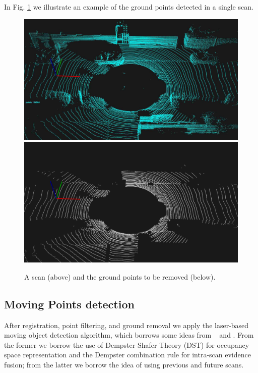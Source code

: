 In Fig. \ref{fig:groundremoval} we illustrate an example of the ground points detected in a single scan.



\begin{figure}
\setlength{\tabcolsep}{1pt}
\begin{center}
\includegraphics[width=0.8\columnwidth]{./img/ch-laser/beforeGroundRemoval} \\
\vspace{0.3cm}
\includegraphics[width=0.8\columnwidth]{./img/ch-laser/postGroundRemoval}
\end{center}
\caption{A scan (above) and the ground points to be removed (below).}
\label{fig:groundremoval}
\end{figure}

\subsection{Moving Points detection}
After registration, point filtering, and ground removal we apply the laser-based moving object detection algorithm, which borrows some ideas from ~\cite{xiao2013change} and \cite{vallet2015extracting}. From the former we borrow the use of Dempster-Shafer Theory (DST) for occupancy space representation and the Dempster combination rule for intra-scan evidence fusion; from the latter we borrow the idea of using previous and future scans.


